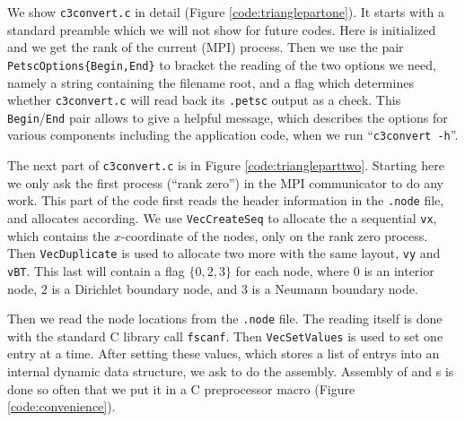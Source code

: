 We show \texttt{c3convert.c} in detail (Figure \ref{code:trianglepartone}).  It starts with a standard preamble which we will not show for future codes.  Here \PETSc is initialized and we get the rank of the current (MPI) process.  Then we use the pair \texttt{PetscOptions\{Begin,End\}} to bracket the reading of the two options we need, namely a string containing the filename root, and a flag which determines whether \texttt{c3convert.c} will read back its \texttt{.petsc} output as a check.  This \texttt{Begin}/\texttt{End} pair allows \PETSc to give a helpful message, which describes the options for various components including the application code, when we run ``\texttt{c3convert -h}''.


The next part of \texttt{c3convert.c} is in Figure \ref{code:triangleparttwo}.  Starting here we only ask the first process (``rank zero'') in the MPI communicator to do any work.  This part of the code first reads the header information in the \texttt{.node} file, and allocates \PETSc \pVecs according.  We use \texttt{VecCreateSeq} to allocate the a sequential \pVec \texttt{vx}, which contains the $x$-coordinate of the nodes, only on the rank zero process.  Then \texttt{VecDuplicate} is used to allocate two more \pVecs with the same layout, \texttt{vy} and \texttt{vBT}.  This last \pVec will contain a flag $\{0,2,3\}$ for each node, where $0$ is an interior node, $2$ is a Dirichlet boundary node, and $3$ is a Neumann boundary node.


Then we read the node locations from the \texttt{.node} file.  The reading itself is done with the standard C library call \texttt{fscanf}.  Then \texttt{VecSetValues} is used to set one entry at a time.  After setting these values, which stores a list of entrys into an internal \PETSc dynamic data structure, we ask \PETSc to do the assembly.  Assembly of \pVecs and \pMat s is done so often that we put it in a C preprocessor macro (Figure \ref{code:convenience}).


